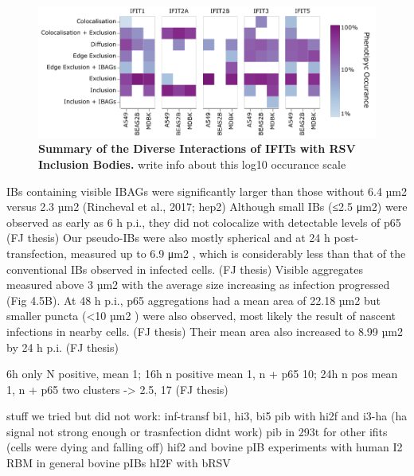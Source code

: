 \begin{figure}
    \centering
    \includegraphics[width=1\linewidth]{08. Chapter 3/Figs/heatmap_infection.pdf}
    \caption[Summary of the Diverse Interactions of IFITs with RSV Inclusion Bodies.]{\textbf{Summary of the Diverse Interactions of IFITs with RSV Inclusion Bodies.} write info about this log10 occurance scale}
    \label{fig:Summary of the Diverse Interactions of IFITs with RSV Inclusion Bodies}
\end{figure}



IBs containing visible IBAGs were significantly larger than those without 6.4 µm2 versus 2.3 µm2 (Rincheval et al., 2017; hep2)
Although small IBs (≤2.5 μm2) were observed as early as 6 h p.i., they did not colocalize with detectable levels of p65 (FJ thesis)
Our pseudo-IBs were also mostly spherical and at 24 h post-transfection, measured up to 6.9 μm2 , which is considerably less than that of the conventional IBs observed in infected cells. (FJ thesis)
Visible aggregates measured above 3 µm2 with the average size increasing as infection progressed (Fig 4.5B). At 48 h p.i., p65 aggregations had a mean area of 22.18 µm2 but smaller puncta (<10 µm2 ) were also observed, most likely the result of nascent infections in nearby cells. (FJ thesis)
Their mean area also increased to 8.99 µm2 by 24 h p.i. (FJ thesis)

6h only N positive, mean 1; 16h n positive mean 1, n + p65 10; 24h n pos mean 1, n + p65 two clusters -> 2.5, 17 (FJ thesis)

stuff we tried but did not work: 
inf-transf bi1, hi3, bi5
pib with hi2f and i3-ha (ha signal not strong enough or trasnfection didnt work)
pib in 293t for other ifits (cells were dying and falling off)
hif2 and bovine pIB
experiments with human I2 RBM
in general bovine pIBs
hI2F with bRSV
